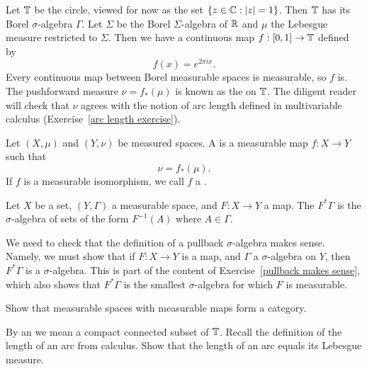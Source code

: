 \begin{example}\label{lebesgue measure torus}
Let $\mathbb{T}$ be the circle, viewed for now as the set $\{z \in \mathbb{C}: |z| = 1\}$.
Then $\mathbb{T}$ has its Borel $\sigma$-algebra $\Gamma$.
Let $\Sigma$ be the Borel $\Sigma$-algebra of $\mathbb{R}$ and $\mu$ the Lebesgue measure restricted to $\Sigma$.
Then we have a continuous map $f: [0, 1] \to \mathbb{T}$ defined by
\[f(x) = e^{2\pi ix}.\]
Every continuous map between Borel measurable spaces is measurable, so $f$ is.
The pushforward measure $\nu = f_{*}(\mu)$ is known as the  on $\mathbb{T}$.
The diligent reader will check that $\nu$ agrees with the notion of arc length defined in multivariable calculus (Exercise~\ref{arc length exercise}).
\end{example}

\begin{definition}
Let $(X, \mu)$ and $(Y, \nu)$ be measured spaces.
A  is a measurable map $f: X \to Y$ such that
\[\nu = f_{*}(\mu).\]
If $f$ is a measurable isomorphism, we call $f$ a .
\end{definition}

\begin{definition}
Let $X$ be a set, $(Y, \Gamma)$ a measurable space, and $F: X \to Y$ a map.
The  $F^{*}\Gamma$ is the $\sigma$-algebra of sets of the form $F^{-1}(A)$ where $A \in \Gamma$.
\end{definition}

\begin{subsec}
We need to check that the definition of a pullback $\sigma$-algebra makes sense.
Namely, we must show that if $F: X \to Y$ is a map, and $\Gamma$ a $\sigma$-algebra on $Y$, then $F^{*}\Gamma$ is a $\sigma$-algebra.
This is part of the content of Exercise~\ref{pullback makes sense}, which also shows that $F^{*}\Gamma$ is the smallest $\sigma$-algebra for which $F$ is measurable.
\end{subsec}

\begin{exercise}
Show that measurable spaces with measurable maps form a category.
\end{exercise}

\begin{exercise}\label{arc length exercise}
By an  we mean a compact connected subset of $\mathbb{T}$.
Recall the definition of the length of an arc from calculus.
Show that the length of an arc equals its Lebesgue measure.
\end{exercise}

